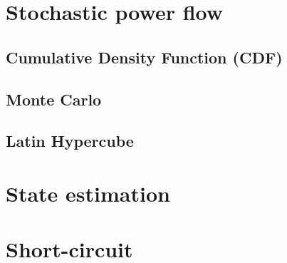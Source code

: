 \documentclass[a4paper,twoside]{tufte-book}
\begin{document}
\chapter{Stochastic power flow}

\section{Cumulative Density Function (CDF)}


\section{Monte Carlo}


\section{Latin Hypercube}




\chapter{State estimation}



\chapter{Short-circuit}





\backmatter





\printindex
\end{document}
